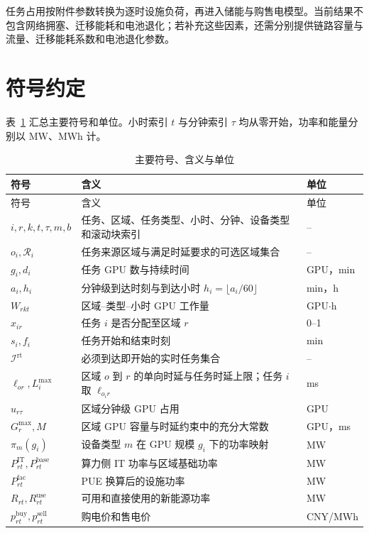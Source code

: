 任务占用按附件参数转换为逐时设施负荷，再进入储能与购售电模型。当前结果不包含网络拥塞、迁移能耗和电池退化；若补充这些因素，还需分别提供链路容量与流量、迁移能耗系数和电池退化参数。

\section{符号约定}

表~\ref{tab:notation} 汇总主要符号和单位。小时索引 $t$ 与分钟索引 $\tau$ 均从零开始，功率和能量分别以 MW、MWh 计。

{\small
\begin{longtable}{@{}p{}p{}p{}@{}}
\caption{主要符号、含义与单位}\label{tab:notation}\\
\toprule
符号 & 含义 & 单位 \\
\midrule
\endfirsthead
\toprule
符号 & 含义 & 单位 \\
\midrule
\endhead
$i,r,k,t,\tau,m,b$ & 任务、区域、任务类型、小时、分钟、设备类型和滚动块索引 & -- \\
$o_i,\mathcal R_i$ & 任务来源区域与满足时延要求的可选区域集合 & -- \\
$g_i,d_i$ & 任务 GPU 数与持续时间 & GPU，min \\
$a_i,h_i$ & 分钟级到达时刻与到达小时 $h_i=\lfloor a_i/60\rfloor$ & min，h \\
$W_{rkt}$ & 区域--类型--小时 GPU 工作量 & GPU$\cdot$h \\
$x_{ir}$ & 任务 $i$ 是否分配至区域 $r$ & 0--1 \\
$s_i,f_i$ & 任务开始和结束时刻 & min \\
$\mathcal I^{\mathrm{rt}}$ & 必须到达即开始的实时任务集合 & -- \\
$\ell_{or},L_i^{\max}$ & 区域 $o$ 到 $r$ 的单向时延与任务时延上限；任务 $i$ 取 $\ell_{o_i r}$ & ms \\
$u_{r\tau}$ & 区域分钟级 GPU 占用 & GPU \\
$G_r^{\max},M$ & 区域 GPU 容量与时延约束中的充分大常数 & GPU，ms \\
$\pi_m(g_i)$ & 设备类型 $m$ 在 GPU 规模 $g_i$ 下的功率映射 & MW \\
$P^{\mathrm{IT}}_{rt},P^{\mathrm{base}}_{rt}$ & 算力侧 IT 功率与区域基础功率 & MW \\
$P^{\mathrm{fac}}_{rt}$ & PUE 换算后的设施功率 & MW \\
$R_{rt},R^{\mathrm{use}}_{rt}$ & 可用和直接使用的新能源功率 & MW \\
$p^{\mathrm{buy}}_{rt},p^{\mathrm{sell}}_{rt}$ & 购电价和售电价 & CNY/MWh \\

\end{longtable}}
